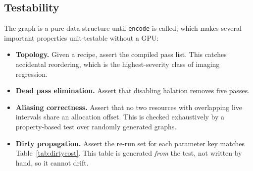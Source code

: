 \subsection{Testability}

The graph is a pure data structure until \texttt{encode} is called, which makes
several important properties unit-testable without a GPU:

\begin{itemize}
\item \textbf{Topology.} Given a recipe, assert the compiled pass list. This
catches accidental reordering, which is the highest-severity class of imaging
regression.
\item \textbf{Dead pass elimination.} Assert that disabling halation removes
five passes.
\item \textbf{Aliasing correctness.} Assert that no two resources with
overlapping live intervals share an allocation offset. This is checked
exhaustively by a property-based test over randomly generated graphs.
\item \textbf{Dirty propagation.} Assert the re-run set for each parameter key
matches Table~\ref{tab:dirtycost}. This table is generated \emph{from} the test,
not written by hand, so it cannot drift.
\end{itemize}
